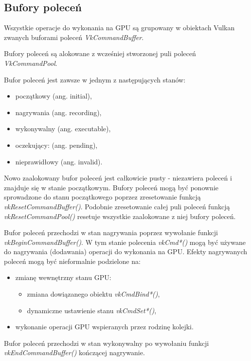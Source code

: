 \subsection{Bufory poleceń}

Wszystkie operacje do wykonania na GPU są grupowany w obiektach Vulkan zwanych buforami poleceń \textit{VkCommandBuffer}.

Bufory poleceń są alokowane z wcześniej stworzonej puli poleceń \textit{VkCommandPool}.

Bufor poleceń jest zawsze w jednym z następujących stanów:
\begin{itemize}
	\item początkowy (ang. initial),
	\item nagrywania (ang. recording),
	\item wykonywalny (ang. executable),
	\item oczekujący: (ang. pending),
	\item nieprawidłowy (ang. invalid).
\end{itemize}

Nowo zaalokowany bufor poleceń jest całkowicie pusty - niezawiera poleceń i znajduje się w stanie początkowym.
Bufory poleceń mogą być ponownie sprowadzone do stanu początkowego poprzez zresetowanie funkcją \textit{vkResetCommandBuffer()}.
Podobnie zresetowanie całej puli poleceń funkcją \textit{vkResetCommandPool()} resetuje wszystkie zaalokowane z niej bufory poleceń.

Bufor poleceń przechodzi w stan nagrywania poprzez wywołanie funkcji \textit{vkBeginCommandBuffer()}.
W tym stanie polecenia \textit{vkCmd*()} mogą być używane do nagrywania (dodawania) operacji do wykonania na GPU.
Efekty nagrywanych poleceń mogą być nieformalnie podzielone na:
\begin{itemize}
	\item zmianę wewnętrzny stanu GPU:
	\begin{itemize}
		\item zmiana dowiązanego obiektu \textit{vkCmdBind*()},
		\item dynamiczne ustawienie stanu \textit{vkCmdSet*()},
	\end{itemize}
	\item wykonanie operacji GPU wspieranych przez rodzinę kolejki.
\end{itemize}


Bufor poleceń przechodzi w stan wykonywalny po wywołaniu funkcji \textit{vkEndCommandBuffer()} kończącej nagrywanie.

